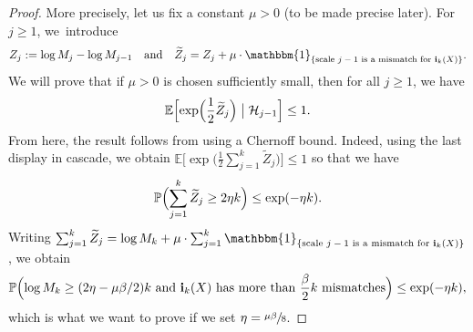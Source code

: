 \documentclass[JEP,XML,SOM,Unicode,NoFloatCountersInSection,published]{cedram}
\newcommand{\bEc}[1]{\mathbb{E} \bigl[#1\bigr]}
\newcommand{\BPp}[1]{\mathbb{P} \Bigl(#1\Bigr)}
\newcommand{\BEcsq}[2]{\mathbb{E} \Bigl[#1\bigm|#2\Bigr]}
\newcommand{\ii}{\mathbf{i}}
\theoremstyle{plain}
\theoremstyle{definition}
\begin{document}
\begin{proof}
More precisely, let us fix a constant $\mu>0$ (to be made precise later). For $j \geq 1$, we~introduce
\begin{align*}
Z_j := \log M_j - \log M_{j-1} \quad \text{and} \quad \widetilde{Z}_j= Z_j + \mu\cdot \mathbbm{1}_{\{\text{scale $j-1$ is a mismatch for $\ii_k(X)$}\}}.
\end{align*}
We will prove that if $\mu>0$ is chosen sufficiently small, then for all $j\geq 1$, we have
\begin{align}\label{eq:small exponential moment tilde Zk}
\BEcsq{\exp\Bigl(\frac12\widetilde{Z}_j\Bigr)}{\mathcal H_{j-1}} \leq 1.
\end{align}
From here, the result follows from using a Chernoff bound. Indeed, using the last display in cascade, we obtain $\bEc{\exp \bigl(\frac{1}{2} \sum_{j=1}^{k}\widetilde{Z}_j \bigr)}\leq 1$ so that we have
\begin{align*}
\BPp{\sum_{j=1}^{k}\widetilde{Z}_j \geq 2 \eta k}\leq \exp(-\eta k).
\end{align*}
Writing $\sum_{j=1}^{k}\widetilde{Z}_j= \log M_k + \mu\cdot \sum_{j=1}^{k}\mathbbm{1}_{\{\text{scale $j-1$ is a mismatch for $\ii_k(X)$}\}}$, we obtain
\[
\BPp{\log M_k \geq (2\eta -\mu \beta/2)k \text{ and } \ii_k(X) \text{ has more than $\frac\beta2 k$ mismatches}} \leq \exp(-\eta k),
\]
which is what we want to prove if we set $\eta=\sfrac{\mu\beta}{8}$.


\end{proof}
\end{document}
